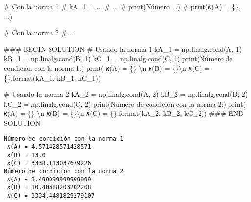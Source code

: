 \documentclass[
  letterpaper,
  DIV=11,
  numbers=noendperiod]{scrreprt}
\newenvironment{Shaded}{\begin{snugshade}}{\end{snugshade}}
\newcommand{\BuiltInTok}[1]{\textcolor[rgb]{0.00,0.23,0.31}{#1}}
\newcommand{\CharTok}[1]{\textcolor[rgb]{0.13,0.47,0.30}{#1}}
\newcommand{\CommentTok}[1]{\textcolor[rgb]{0.37,0.37,0.37}{#1}}
\newcommand{\DecValTok}[1]{\textcolor[rgb]{0.68,0.00,0.00}{#1}}
\newcommand{\NormalTok}[1]{\textcolor[rgb]{0.00,0.23,0.31}{#1}}
\newcommand{\OperatorTok}[1]{\textcolor[rgb]{0.37,0.37,0.37}{#1}}
\newcommand{\RegionMarkerTok}[1]{\textcolor[rgb]{0.00,0.23,0.31}{#1}}
\newcommand{\SpecialCharTok}[1]{\textcolor[rgb]{0.37,0.37,0.37}{#1}}
\newcommand{\StringTok}[1]{\textcolor[rgb]{0.13,0.47,0.30}{#1}}
\begin{document}
\begin{Shaded}
\begin{Highlighting}[]
\CommentTok{\# Con la norma 1}
\CommentTok{\# kA\_1 = ...}
\CommentTok{\# ...}
\CommentTok{\# print(\textquotesingle{}Número ...)}
\CommentTok{\# print(\textquotesingle{}𝜅(A) = \{\}, ...)}

\CommentTok{\# Con la norma 2}
\CommentTok{\# ...}

\CommentTok{\#\#\# }\RegionMarkerTok{BEGIN}\CommentTok{ SOLUTION}
\CommentTok{\# Usando la norma 1}
\NormalTok{kA\_1 }\OperatorTok{=}\NormalTok{ np.linalg.cond(A, }\DecValTok{1}\NormalTok{)}
\NormalTok{kB\_1 }\OperatorTok{=}\NormalTok{ np.linalg.cond(B, }\DecValTok{1}\NormalTok{)}
\NormalTok{kC\_1 }\OperatorTok{=}\NormalTok{ np.linalg.cond(C, }\DecValTok{1}\NormalTok{)}
\BuiltInTok{print}\NormalTok{(}\StringTok{\textquotesingle{}Número de condición con la norma 1:\textquotesingle{}}\NormalTok{)}
\BuiltInTok{print}\NormalTok{(}\StringTok{\textquotesingle{} 𝜅(A) = }\SpecialCharTok{\{\}}\StringTok{ }\CharTok{\textbackslash{}n}\StringTok{ 𝜅(B) = }\SpecialCharTok{\{\}}\CharTok{\textbackslash{}n}\StringTok{ 𝜅(C) = }\SpecialCharTok{\{\}}\StringTok{\textquotesingle{}}\NormalTok{.}\BuiltInTok{format}\NormalTok{(kA\_1, kB\_1, kC\_1))}

\CommentTok{\# Usando la norma 2}
\NormalTok{kA\_2 }\OperatorTok{=}\NormalTok{ np.linalg.cond(A, }\DecValTok{2}\NormalTok{)}
\NormalTok{kB\_2 }\OperatorTok{=}\NormalTok{ np.linalg.cond(B, }\DecValTok{2}\NormalTok{)}
\NormalTok{kC\_2 }\OperatorTok{=}\NormalTok{ np.linalg.cond(C, }\DecValTok{2}\NormalTok{)}
\BuiltInTok{print}\NormalTok{(}\StringTok{\textquotesingle{}Número de condición con la norma 2:\textquotesingle{}}\NormalTok{)}
\BuiltInTok{print}\NormalTok{(}\StringTok{\textquotesingle{} 𝜅(A) = }\SpecialCharTok{\{\}}\StringTok{ }\CharTok{\textbackslash{}n}\StringTok{ 𝜅(B) = }\SpecialCharTok{\{\}}\CharTok{\textbackslash{}n}\StringTok{ 𝜅(C) = }\SpecialCharTok{\{\}}\StringTok{\textquotesingle{}}\NormalTok{.}\BuiltInTok{format}\NormalTok{(kA\_2, kB\_2, kC\_2))}
\CommentTok{\#\#\# }\RegionMarkerTok{END}\CommentTok{ SOLUTION}
\end{Highlighting}
\end{Shaded}

\begin{verbatim}
Número de condición con la norma 1:
 𝜅(A) = 4.571428571428571 
 𝜅(B) = 13.0
 𝜅(C) = 3338.113037679226
Número de condición con la norma 2:
 𝜅(A) = 3.499999999999999 
 𝜅(B) = 10.40388203202208
 𝜅(C) = 3334.4481829279107
\end{verbatim}
\end{document}
